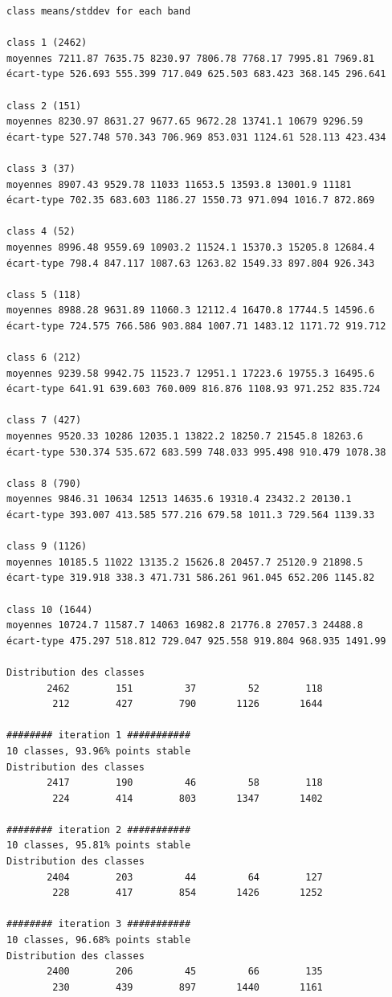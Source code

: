 \documentclass[earth,article,submit,pdftex,moreauthors]{Definitions/mdpi}
\begin{document}
{\begin{scriptsize}
\begin{verbatim}
class means/stddev for each band

class 1 (2462)
moyennes 7211.87 7635.75 8230.97 7806.78 7768.17 7995.81 7969.81
écart-type 526.693 555.399 717.049 625.503 683.423 368.145 296.641

class 2 (151)
moyennes 8230.97 8631.27 9677.65 9672.28 13741.1 10679 9296.59
écart-type 527.748 570.343 706.969 853.031 1124.61 528.113 423.434

class 3 (37)
moyennes 8907.43 9529.78 11033 11653.5 13593.8 13001.9 11181
écart-type 702.35 683.603 1186.27 1550.73 971.094 1016.7 872.869

class 4 (52)
moyennes 8996.48 9559.69 10903.2 11524.1 15370.3 15205.8 12684.4
écart-type 798.4 847.117 1087.63 1263.82 1549.33 897.804 926.343

class 5 (118)
moyennes 8988.28 9631.89 11060.3 12112.4 16470.8 17744.5 14596.6
écart-type 724.575 766.586 903.884 1007.71 1483.12 1171.72 919.712

class 6 (212)
moyennes 9239.58 9942.75 11523.7 12951.1 17223.6 19755.3 16495.6
écart-type 641.91 639.603 760.009 816.876 1108.93 971.252 835.724

class 7 (427)
moyennes 9520.33 10286 12035.1 13822.2 18250.7 21545.8 18263.6
écart-type 530.374 535.672 683.599 748.033 995.498 910.479 1078.38

class 8 (790)
moyennes 9846.31 10634 12513 14635.6 19310.4 23432.2 20130.1
écart-type 393.007 413.585 577.216 679.58 1011.3 729.564 1139.33

class 9 (1126)
moyennes 10185.5 11022 13135.2 15626.8 20457.7 25120.9 21898.5
écart-type 319.918 338.3 471.731 586.261 961.045 652.206 1145.82

class 10 (1644)
moyennes 10724.7 11587.7 14063 16982.8 21776.8 27057.3 24488.8
écart-type 475.297 518.812 729.047 925.558 919.804 968.935 1491.99

Distribution des classes
       2462        151         37         52        118
        212        427        790       1126       1644

######## iteration 1 ###########
10 classes, 93.96% points stable
Distribution des classes
       2417        190         46         58        118
        224        414        803       1347       1402

######## iteration 2 ###########
10 classes, 95.81% points stable
Distribution des classes
       2404        203         44         64        127
        228        417        854       1426       1252

######## iteration 3 ###########
10 classes, 96.68% points stable
Distribution des classes
       2400        206         45         66        135
        230        439        897       1440       1161


\end{verbatim}
\end{scriptsize}}
\end{document}
